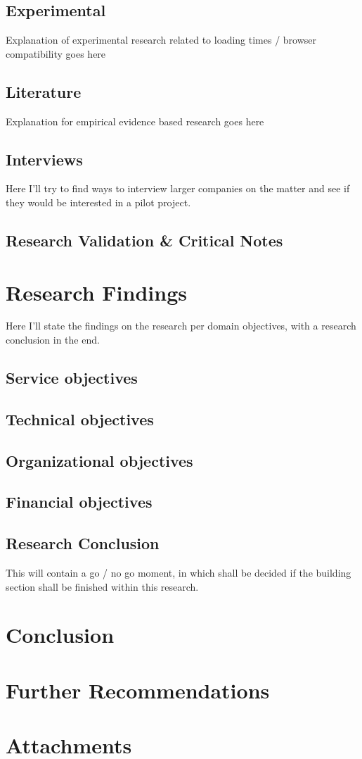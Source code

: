 \documentclass[signatures]{Thesis}
\begin{document}
    \section{Experimental}
    Explanation of experimental research related to loading times / browser compatibility goes here
    \section{Literature}
    Explanation for empirical evidence based research goes here
    \section{Interviews}
    Here I'll try to find ways to interview larger companies on the matter and see if they would be interested in a pilot project.
    \section{Research Validation \& Critical Notes}
    
    
\chapter{Research Findings}
Here I'll state the findings on the research per domain objectives, with a research conclusion in the end.
	\section{Service objectives}
    \section{Technical objectives}
    \section{Organizational objectives}
    \section{Financial objectives}
	\section{Research Conclusion}
	This will contain a go / no go moment, in which shall be decided if the building section shall be finished within this research.
	

\chapter{Conclusion}

\chapter{Further Recommendations}

\chapter{Attachments}


\end{document}
